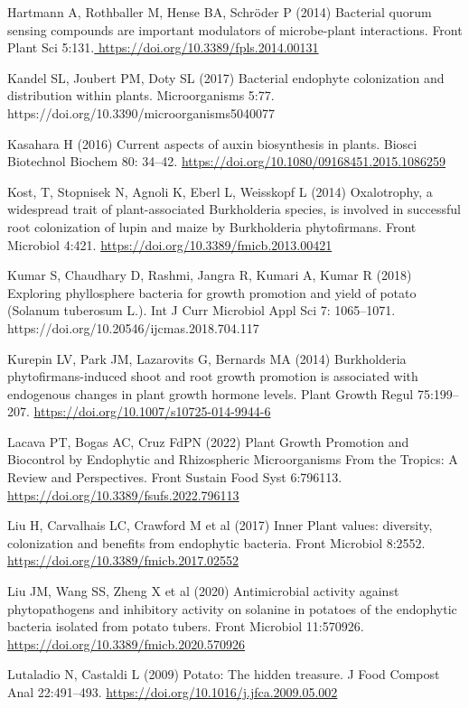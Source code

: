 \documentclass[sn-mathphys,Numbered]{sn-jnl}%
\theoremstyle{thmstyleone}%
\theoremstyle{thmstyletwo}%
\theoremstyle{thmstylethree}%
\begin{document}
Hartmann A, Rothballer M, Hense BA, Schröder P (2014) Bacterial quorum sensing compounds are important modulators of microbe-plant interactions. Front Plant Sci 5:131.\url{ https://doi.org/10.3389/fpls.2014.00131}

Kandel SL, Joubert PM, Doty SL (2017) Bacterial endophyte colonization and distribution within plants. Microorganisms 5:77. https://doi.org/10.3390/microorganisms5040077

Kasahara H (2016) Current aspects of auxin biosynthesis in plants. Biosci Biotechnol Biochem 80: 34–42. \url{https://doi.org/10.1080/09168451.2015.1086259}

Kost, T, Stopnisek N, Agnoli K, Eberl L, Weisskopf L (2014) Oxalotrophy, a widespread trait of plant-associated Burkholderia species, is involved in successful root colonization of lupin and maize by Burkholderia phytofirmans. Front Microbiol 4:421. \url{https://doi.org/10.3389/fmicb.2013.00421}

Kumar S, Chaudhary D, Rashmi, Jangra R, Kumari A, Kumar R (2018) Exploring phyllosphere bacteria for growth promotion and yield of potato (Solanum tuberosum L.). Int J Curr Microbiol Appl Sci 7: 1065–1071. https://doi.org/10.20546/ijcmas.2018.704.117

Kurepin LV, Park JM, Lazarovits G, Bernards MA (2014) Burkholderia phytofirmans-induced shoot and root growth promotion is associated with endogenous changes in plant growth hormone levels. Plant Growth Regul 75:199–207. \url{https://doi.org/10.1007/s10725-014-9944-6}

Lacava PT, Bogas AC, Cruz FdPN (2022) Plant Growth Promotion and Biocontrol by Endophytic and Rhizospheric Microorganisms From the Tropics: A Review and Perspectives. Front Sustain Food Syst 6:796113. \url{https://doi.org/10.3389/fsufs.2022.796113}

Liu H, Carvalhais LC, Crawford M et al (2017) Inner Plant values: diversity, colonization and benefits from endophytic bacteria. Front Microbiol 8:2552. \url{https://doi.org/10.3389/fmicb.2017.02552}

Liu JM, Wang SS, Zheng X et al (2020) Antimicrobial activity against phytopathogens and inhibitory activity on solanine in potatoes of the endophytic bacteria isolated from potato tubers. Front Microbiol 11:570926. \url{https://doi.org/10.3389/fmicb.2020.570926}

Lutaladio N, Castaldi L (2009) Potato: The hidden treasure. J Food Compost Anal 22:491–493. \url{https://doi.org/10.1016/j.jfca.2009.05.002}
\end{document}
